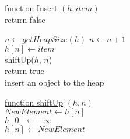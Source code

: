 \documentclass{article}
\begin{document}
\begin{algorithm}
    

    \underline{function Insert} $(h, item)$\\
        {
            return false\\
        }
        
        $n \leftarrow getHeapSize(h)$ 
        $n \leftarrow n + 1$\\
        $h[n] \leftarrow item$\\
        shiftUp($h$, $n$)\\
        return true\\
    \caption{insert an object to the heap}
    
    \BlankLine
    \BlankLine
    
    \underline{function shiftUp} $(h, n)$\\
    $NewElement \leftarrow h[n]$\\
    $h[0] \leftarrow -\infty$\\
    $h[n] \leftarrow NewElement$
    
\end{algorithm}
\end{document}
